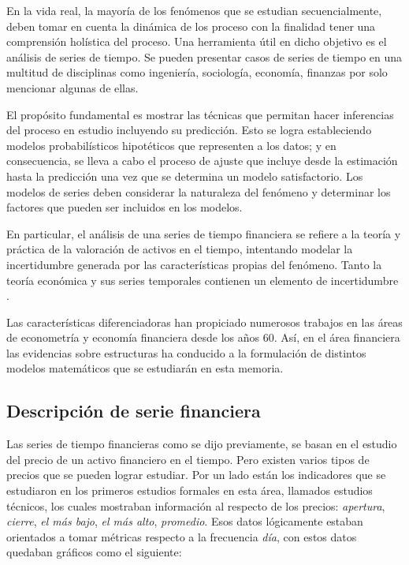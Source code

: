En la vida real, la mayoría de los fenómenos que se estudian secuencialmente, deben
tomar en cuenta la dinámica de los proceso con la finalidad tener una comprensión holística del proceso.
Una herramienta útil en dicho objetivo es el análisis de series de tiempo. Se
pueden presentar casos de series de tiempo en una multitud de disciplinas como ingeniería,
sociología, economía, finanzas por solo mencionar algunas de ellas.

El propósito fundamental es mostrar las técnicas que permitan hacer inferencias del
proceso en estudio incluyendo su predicción. Esto se logra estableciendo modelos
probabilísticos hipotéticos que representen a los datos; y en consecuencia, se lleva a cabo el
proceso de ajuste que incluye desde la estimación hasta la predicción una vez que se determina
un modelo satisfactorio. Los modelos de series deben considerar la naturaleza del fenómeno y determinar 
los factores que pueden ser incluidos en los modelos.

En particular, el análisis de una series de tiempo financiera se refiere a la teoría y práctica de la valoración 
de activos en el tiempo, intentando modelar la incertidumbre generada por las características propias del fenómeno. Tanto la teoría económica 
y sus series temporales contienen un elemento de incertidumbre \cite{tsay2005analysis}. 

Las características diferenciadoras han propiciado numerosos trabajos en las áreas de econometría y economía financiera desde los años 60.
Así, en el área financiera las evidencias sobre estructuras ha conducido a la formulación de distintos modelos matemáticos que se estudiarán
en esta memoria.

\subsection{Descripción de serie financiera}

Las series de tiempo financieras como se dijo previamente, se basan en el estudio del precio de un activo financiero en el tiempo. Pero existen 
varios tipos de precios que se pueden lograr estudiar. Por un lado están los indicadores que se estudiaron en los primeros estudios formales
en esta área, llamados estudios técnicos, los cuales mostraban información al respecto de los precios: \emph{apertura}, \emph{cierre}, \emph{el más bajo}, 
\emph{el más alto}, \emph{promedio}. Esos datos lógicamente estaban orientados a tomar métricas respecto a la frecuencia \emph{día}, con estos
datos quedaban gráficos como el siguiente:

